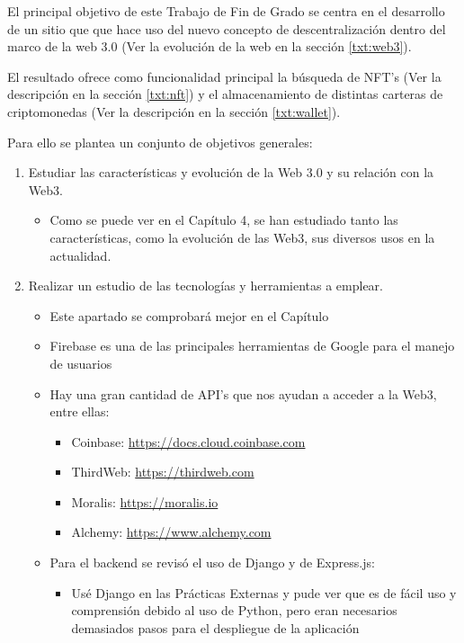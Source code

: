 El principal objetivo de este Trabajo de Fin de Grado se centra en el desarrollo
de un sitio que que hace uso del nuevo concepto de descentralización dentro del
marco de la web 3.0 (Ver la evolución de la web en la sección \ref{txt:web3}).

El resultado ofrece como funcionalidad principal la búsqueda de NFT's (Ver la 
descripción en la sección \ref{txt:nft}) y el 
almacenamiento de distintas carteras de criptomonedas (Ver la 
descripción en la sección \ref{txt:wallet}).

Para ello se plantea un conjunto de objetivos generales:
\begin{enumerate}
    \item Estudiar las características y evolución de la Web 3.0 y su relación con la Web3.
    \begin{itemize}
        \item Como se puede ver en el Capítulo 4, se han estudiado tanto las características, como la 
        evolución de las Web3, sus diversos usos en la actualidad.
    \end{itemize}
    \item Realizar un estudio de las tecnologías y herramientas a emplear.
    \begin{itemize}
        \item Este apartado se comprobará mejor en el Capítulo 
        \item Firebase es una de las principales herramientas de Google para el manejo de usuarios
        \item Hay una gran cantidad de API's que nos ayudan a acceder a la Web3, entre ellas:
        \begin{itemize}
            \item Coinbase: \url{https://docs.cloud.coinbase.com}
            \item ThirdWeb: \url{https://thirdweb.com}
            \item Moralis: \url{https://moralis.io}
            \item Alchemy: \url{https://www.alchemy.com}
        \end{itemize} 
        \item Para el backend se revisó el uso de Django y de Express.js:
        \begin{itemize}
            \item Usé Django en las Prácticas Externas y pude ver que es de fácil 
            uso y comprensión debido al uso de Python, pero eran necesarios demasiados
            pasos para el despliegue de la aplicación

\end{itemize}
\end{itemize}
\end{enumerate}
